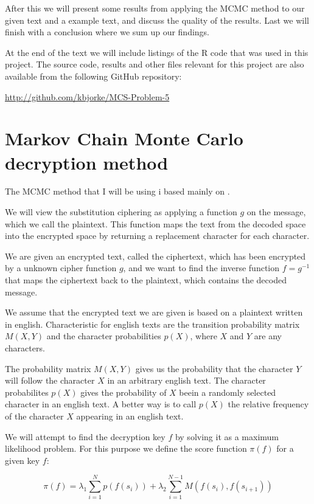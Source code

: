 \documentclass[a4paper, 11pt]{article}
\begin{document}
After this we will present some results from applying the MCMC method to
our given text and a example text, and discuss the quality of the results.
Last we will finish with a conclusion where we sum up our findings.

At the end of the text we will include listings of the R code that was used
in this project. The source code, results and other files relevant for this
project are also available from the following GitHub repository:

\href{http://github.com/kbjorke/MCS-Problem-5}{http://github.com/kbjorke/MCS-Problem-5}

\section{Markov Chain Monte Carlo decryption method}

The MCMC method that I will be using i based mainly on \cite{Kocmanek}.

We will view the substitution ciphering as applying a function $g$ on the
message, which we call the plaintext. This function maps the text from the
decoded space into the encrypted space by returning a replacement character
for each character.

We are given an encrypted text, called the ciphertext, which has been 
encrypted by a unknown cipher function $g$, and we want to find the 
inverse function $f = g^{-1}$ that maps the ciphertext back to the plaintext,
which contains the decoded message.

We assume that the encrypted text we are given is based on a plaintext 
written in english. Characteristic for english texts are the transition 
probability matrix $M(X,Y)$ and the character probabilities $p(X)$, where
$X$ and $Y$ are any characters.

The probability matrix $M(X,Y)$ gives us the probability that the character
$Y$ will follow the character $X$ in an arbitrary english text. The
character probabilites $p(X)$ gives the probability of $X$ beein a randomly
selected character in an english text. A better way is to call $p(X)$ the
relative frequency of the character $X$ appearing in an english text.

We will attempt to find the decryption key $f$ by solving it as a maximum
likelihood problem. For this purpose we define the score function $\pi(f)$ 
for a given key $f$:

\begin{equation}
  \pi(f) = \lambda_1 \sum_{i=1}^{N} p(f(s_i)) + 
  \lambda_2 \sum_{i=1}^{N-1} M(f(s_i),f(s_{i+1}))
  \label{eq:ScoreFunc}
\end{equation}
\end{document}

